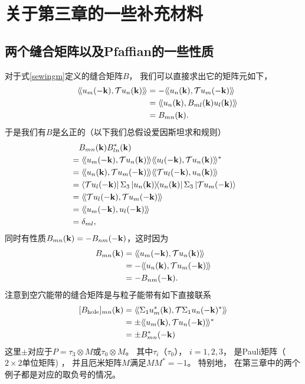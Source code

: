 
\chapter{关于第三章的一些补充材料}

\section{两个缝合矩阵以及Pfaffian的一些性质}\label{cbrelation1}

对于式\eqref{sewingm}定义的缝合矩阵$B$，
我们可以直接求出它的矩阵元如下，
\begin{equation}
	\begin{split}\label{smb}
	\quad \langle\!\langle u_m(-\vb k),\mathcal T u_n(\vb k) \rangle\!\rangle &= -\langle\!\langle u_n(\vb k),\mathcal T u_m(-\vb k) \rangle\!\rangle\\
	&= \langle\!\langle u_n(\vb k),B_{ml}(\vb k)u_l(\vb k) \rangle\!\rangle\\
	&= B_{mn}(\vb k).
	\end{split}
\end{equation}
于是我们有$B$是幺正的（以下我们总假设爱因斯坦求和规则）
\begin{equation}
	\begin{split}
	&\quad	B_{mn}(\vb k)B^*_{ln}(\vb k)\\
		 &=\krin{u_m(-\vb k),\mathcal T u_n(\vb k)}\krin{u_l(-\vb k),\mathcal T u_n(\vb k)}^*\\
	&=\krin{u_n(\vb k),\mathcal T u_m(-\vb k)}\krin{\mathcal T u_l(-\vb k),u_n(\vb k)}\\
	&=\bra{\mathcal T u_l(-\vb k)}\Sigma_3 \ketbra{u_n(\vb k)}{u_n(\vb k)}\Sigma_3\ket{\mathcal T u_m(-\vb k)}\\
	&= \krin{\mathcal T u_l(-\vb k), \mathcal T u_m(-\vb k)} \\
	&= \krin{u_m(-\vb k),u_l(-\vb k)}\\
	&=\delta_{ml},
	\end{split}
\end{equation}
同时有性质$B_{mn}(\vb k)=-B_{nm}(-\vb k)$，这时因为
\begin{equation}\label{bmnbnm}
	\begin{split}
		B_{mn}(\vb k) &= \langle\!\langle u_m(-\vb k),\mathcal T u_n(\vb k) \rangle\!\rangle\\
	&= -\langle\!\langle u_n(\vb k),\mathcal T u_m(-\vb k) \rangle\!\rangle\\
	&= -B_{nm}(-\vb k).
	\end{split}
\end{equation}
注意到空穴能带的缝合矩阵是与粒子能带有如下直接联系
\begin{equation}\label{bhole}
	\begin{split}
		[B_{\textnormal{hole}}]_{mn}(\vb k)&=\langle\!\langle \Sigma_1 u_m^*(\vb k),\mathcal T \Sigma_1 u_n(-\vb k)^* \rangle\!\rangle\\
	&=\pm \langle\!\langle u_m(\vb k),\mathcal T u_n(-\vb k) \rangle\!\rangle^*\\
	&=\pm B_{mn}^*(-\vb k)
	\end{split}
\end{equation}
这里$\pm$对应于$P=\tau_3\otimes M$或$\tau_0\otimes M$。
其中$\tau_i$（$\tau_0$），
$i=1,2,3$，
是Pauli矩阵（$2\times 2$单位矩阵) ，
并且厄米矩阵$M$满足$MM^*=-1$。
特别地，
在第三章中的两个例子都是对应的取负号的情况。

